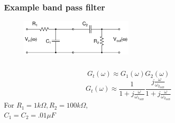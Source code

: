 \documentclass[beamer]{standalone}
\begin{document}
\frame
{ \frametitle{ Example band pass filter}
\begin{figure}
 \includegraphics[angle=0,width=0.5\textwidth]{./circuits/band_pass_filter.pdf}
\end{figure}
\begin{columns}
 \begin{column}{.50\textwidth}
  \[
  G_t(\omega) \approx G_1(\omega) G_2(\omega) 
  \]
  \[
  G_t(\omega) \approx
  \frac{1}{1+j\frac{\omega}{\omega_{1_{3dB}}}}
  \frac{j \frac{\omega}{\omega_{2_{3dB}}}}{1+j\frac{\omega}{\omega_{2_{3dB}}}}
  \]
  For $R_1=1 k\Omega, R_2=100 k\Omega$,\\
  $C_1=C_2=.01 \mu F$
 \end{column}
\end{columns}
}
\end{document}
